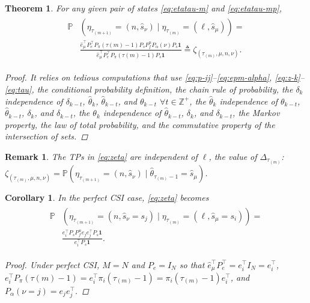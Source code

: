 \documentclass[journal,twoside,web]{ieeecolor}
\newtheorem{theorem}{Theorem}
\newtheorem{corollary}{Corollary}[theorem]
\newtheorem{remark}{Remark}
\begin{document}
\begin{theorem}\label{theorem:eta-probability}
    For any given pair of states \eqref{eq:etatau-m} and \eqref{eq:etatau-mp}, 
    \begin{align}\label{eq:zeta}
    \begin{aligned}
        \mathbb{P}&(\eta_{\tau_{(m+1)}}^{} = (n,\hat{s}_{\nu}) \mid \eta_{\tau_{(m)}}^{} = (\ell,\hat{s}_{\mu})) = \\
        & \frac{\hat{e}_{\mu}^{\top} P_{e}^{\top} P_{\pi}(\tau{(m)}-1) P_{s} P_{f}^{n} P_{\alpha}(\nu) P_{s} \mathbf{1}}{\hat{e}_{\mu}^{\top} P_{e}^{\top} P_{\pi}(\tau{(m)}-1) P_{s}\mathbf{1}} \triangleq \zeta_{(\tau_{(m)},\mu,n,\nu)}.
    \end{aligned}        
    \end{align}
\begin{proof}
    It relies on tedious computations that use \eqref{eq:p-ij}–\eqref{eq:epm-alpha}, \eqref{eq:z-k}–\eqref{eq:tau}, the conditional probability definition, the chain rule of probability, the $\delta_{k}$ independence of $\delta_{k-t}$, $\hat{\theta}_{k}$, $\hat{\theta}_{k-t}$, and $\theta_{k-t}$ $\forall t \in \mathbb{Z}^{+}$, the $\hat{\theta}_{k}$ independence of $\theta_{k-t}$, $\hat{\theta}_{k-t}$, $\delta_k$, and $\delta_{k-t}$,
    the $\theta_{k}$ independence of $\hat{\theta}_{k-t}$, $\delta_{k}$, and $\delta_{k-t}$,
    the Markov property, the law of total probability, 
    and the commutative property of the intersection of sets.
\end{proof}
\end{theorem}
\begin{remark}\label{rem:zeta-l-independence}
The TPs in \eqref{eq:zeta} are independent of $\ell$, the value of $\mathit{\Delta}_{\tau_{(m)}}$: $\zeta_{(\tau_{(m)},\mu,n,\nu)} = \mathbb{P}(\eta_{\tau_{(m+1)}}^{} \!= (n,\hat{s}_{\nu}) \mid \hat{\theta}_{\tau_{(m)}-1} \!= \hat{s}_{\mu})$.
\end{remark}
\begin{corollary}\label{corollary:eta}
In the \emph{perfect CSI} case, \eqref{eq:zeta} becomes
\begin{align}\label{eq:zeta-perfect-csi}
    \begin{aligned}
        \mathbb{P}&(\eta_{\tau_{(m+1)}}^{} = (n,\hat{s}_{\nu}=s_j) \mid \eta_{\tau_{(m)}}^{} = (\ell,\hat{s}_{\mu}=s_i)) = \\
        &\frac{e_{i}^{\top} P_{s} P_{f}^{n} e_{j}e_{j}^{\top} P_{s} \mathbf{1}}{e_{i}^{\top} P_{s}\mathbf{1}}.
    \end{aligned}
\end{align}
\begin{proof}
    Under perfect CSI, $M=N$ and $P_e = I_{N}$ so that $\hat{e}_{\mu}^{\top} P_{e}^{\top} = e_{i}^{\top} I_{N} = e_{i}^{\top}$, $e_{i}^{\top} P_{\pi}(\tau{(m)}-1)=e_{i}^{\top}\pi_{i}(\tau_{(m)}-1)=\pi_{i}(\tau_{(m)}-1)e_{i}^{\top}$, and $P_{\alpha}(\nu=j)=e_{j}e_{j}^{\top}$.
\end{proof}
\end{corollary}
\end{document}
